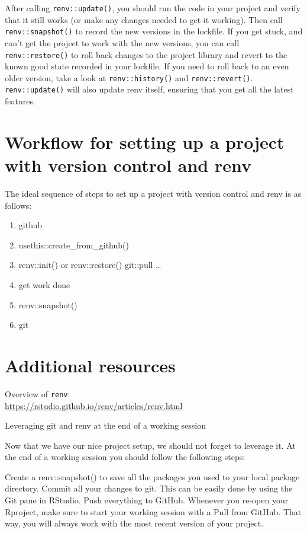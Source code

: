 \documentclass[
  letterpaper,
  DIV=11,
  numbers=noendperiod]{scrreport}
\begin{document}
After calling \texttt{renv::update()}, you should run the code in your
project and verify that it still works (or make any changes needed to
get it working). Then call \texttt{renv::snapshot()} to record the new
versions in the lockfile. If you get stuck, and can't get the project to
work with the new versions, you can call \texttt{renv::restore()} to
roll back changes to the project library and revert to the known good
state recorded in your lockfile. If you need to roll back to an even
older version, take a look at \texttt{renv::history()} and
\texttt{renv::revert()}. \texttt{renv::update()} will also update renv
itself, ensuring that you get all the latest features.

\section{Workflow for setting up a project with version control and
renv}\label{workflow-for-setting-up-a-project-with-version-control-and-renv}

The ideal sequence of steps to set up a project with version control and
renv is as follows:

\begin{enumerate}
\def\labelenumi{\arabic{enumi}.}
\item
  github
\item
  usethis::create\_from\_github()
\item
  renv::init() or renv::restore() git::pull \ldots{}
\item
  get work done
\item
  renv::snapshot()
\item
  git
\end{enumerate}

\section{Additional resources}\label{additional-resources-2}

Overview of \texttt{renv}:\\
\url{https://rstudio.github.io/renv/articles/renv.html}

Leveraging git and renv at the end of a working session

Now that we have our nice project setup, we should not forget to
leverage it. At the end of a working session you should follow the
following steps:

Create a renv::snapshot() to save all the packages you used to your
local package directory. Commit all your changes to git. This can be
easily done by using the Git pane in RStudio. Push everything to GitHub.
Whenever you re-open your Rproject, make sure to start your working
session with a Pull from GitHub. That way, you will always work with the
most recent version of your project.
\end{document}
